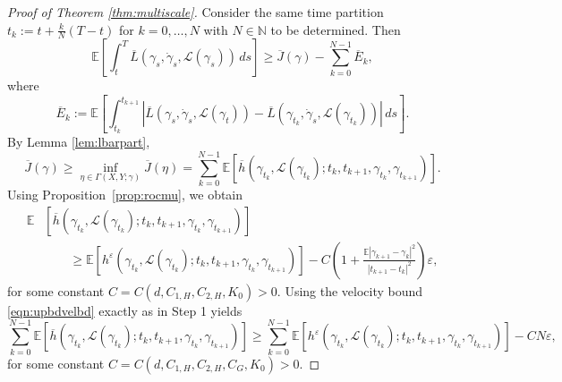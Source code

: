 \documentclass[reqno,11pt]{amsart}
\numberwithin{equation}{section}
\newcommand{\be}{\begin{equation}}
\newcommand{\ee}{\end{equation}}
\newcommand{\R}{\mathbb{R}} %
\newcommand{\e}{\varepsilon}
\newcommand{\ep}{\varepsilon}
\renewcommand{\bar}{\overline}
\begin{document}
\begin{proof}[Proof of Theorem \ref{thm:multiscale}]
Consider the same time partition $t_k := t + \frac{k}{N}(T-t)$ for $ k=0,\dots,N$ with $N\in \mathbb{N}$ to be determined. Then
\begin{equation}\label{eqn:upbdLbar}
\mathbb{E}\left[\int^T_{t} \bar{L}\left(\gamma_s, \dot{\gamma}_s, \mathcal{L}(\gamma_s) \right) \, ds\right]\geq \bar{J}(\gamma)-\sum_{k=0}^{N-1} \bar{E}_k,
\end{equation}
where
\[
\bar{E}_k:= \mathbb{E}\left[\int_{t_k}^{t_{k+1}}\left|\bar{L}\left(\gamma_s,
\dot{\gamma}_s,
\mathcal{L}\left(\gamma_t\right)
\right)-\bar{L}\left(\gamma_{t_k},
\dot{\gamma}_s,
 \mathcal{L}(\gamma_{t_k})
\right) \right|\,ds\right].
\]
By Lemma \ref{lem:lbarpart},
\begin{equation}\label{eqn:upbdJbar}
\bar{J}(\gamma) \geq \inf_{\eta\in \Gamma(X,Y;\gamma)} \bar J(\eta) =\sum_{k=0}^{N-1}
\mathbb{E} \left[
\bar{h} \left(\gamma_{t_k}, \mathcal{L}(\gamma_{t_k});t_k,t_{k+1},
\gamma_{t_k},\gamma_{t_{k+1}}\right)\right].
\end{equation}
Using Proposition~\ref{prop:rocmu}, we obtain
\be\nonumber
\begin{split}
\mathbb{E}& \left[
\bar{h} \left(\gamma_{t_k}, \mathcal{L}(\gamma_{t_k});t_k,t_{k+1},
\gamma_{t_k},\gamma_{t_{k+1}}\right)\right]\\
 &\qquad\geq \mathbb{E} \left[h^\e \left(\gamma_{t_k}, \mathcal{L}(\gamma_{t_k});t_k,t_{k+1},
\gamma_{t_k},\gamma_{t_{k+1}}\right)\right]-C\left(1+\frac{ \mathbb{E}\left|\gamma_{k+1}-\gamma_k\right|^2}{|t_{k+1}-t_k|^2}\right) \ep,
\end{split}
\ee
for some constant $C=C(d, C_{1,H},C_{2,H},K_0)>0$. Using the velocity bound \eqref{eqn:upbdvelbd} exactly as in Step 1 yields
\begin{equation}\label{eqn:upbdsumroc}
\sum_{k=0}^{N-1}
\mathbb E\left[\bar{h}\left(\gamma_{t_k}, \mathcal{L}(\gamma_{t_k}); t_k,t_{k+1},
\gamma_{t_k},\gamma_{t_{k+1}}\right)\right]\geq \sum_{k=0}^{N-1}\mathbb{E}\left[h^\e \left(\gamma_{t_k}, \mathcal{L}(\gamma_{t_k}); t_k,t_{k+1},
\gamma_{t_k},\gamma_{t_{k+1}}\right)\right] -C N\ep,
\end{equation}
for some constant $C=C(d, C_{1,H},C_{2,H},C_G, K_0)>0$.


\end{proof}
\end{document}
